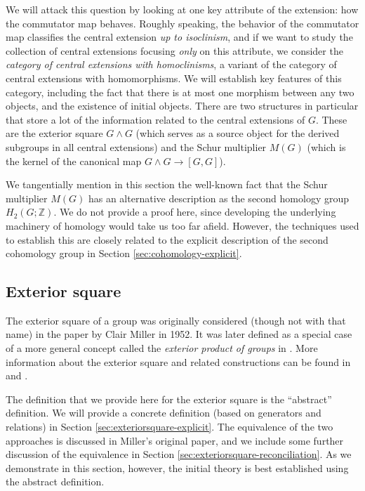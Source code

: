 \documentclass{ucetd}
\begin{document}
We will attack this question by looking at one key attribute of the
extension: how the commutator map behaves. Roughly speaking, the
behavior of the commutator map classifies the central extension {\em
  up to isoclinism}, and if we want to study the collection of central
extensions focusing {\em only} on this attribute, we consider the {\em
  category of central extensions with homoclinisms}, a variant of the
category of central extensions with homomorphisms. We will establish
key features of this category, including the fact that there is at
most one morphism between any two objects, and the existence of
initial objects. There are two structures in particular that store a
lot of the information related to the central extensions of $G$. These
are the exterior square $G \wedge G$ (which serves as a source object
for the derived subgroups in all central extensions) and the Schur
multiplier $M(G)$ (which is the kernel of the canonical map $G \wedge
G \to [G,G]$).

We tangentially mention in this section the well-known fact that the
Schur multiplier $M(G)$ has an alternative description as the second
homology group $H_2(G;\mathbb{Z})$. We do not provide a proof here,
since developing the underlying machinery of homology would take us
too far afield. However, the techniques used to establish this are
closely related to the explicit description of the second cohomology
group in Section \ref{sec:cohomology-explicit}.

\subsection{Exterior square}\label{sec:exteriorsquare}

The exterior square of a group was originally considered (though not
with that name) in the paper \cite{Miller52} by Clair Miller in
1952. It was later defined as a special case of a more general concept
called the {\em exterior product of groups} in \cite{BrownLoday}. More
information about the exterior square and related constructions can be
found in \cite{McDermottThesis} and \cite{Ellis87}.

The definition that we provide here for the exterior square is the
``abstract'' definition. We will provide a concrete definition (based
on generators and relations) in Section
\ref{sec:exteriorsquare-explicit}. The equivalence of the two
approaches is discussed in Miller's original paper, and we include
some further discussion of the equivalence in Section
\ref{sec:exteriorsquare-reconciliation}. As we demonstrate in this
section, however, the initial theory is best established using the
abstract definition.
\end{document}
